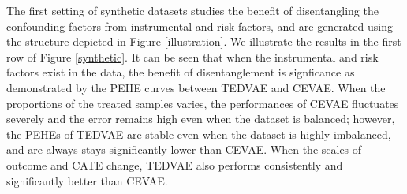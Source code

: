 \documentclass[letterpaper]{article} %
\begin{document}

The first setting of synthetic datasets studies the benefit of disentangling the confounding factors from instrumental and risk factors, and are generated using the structure depicted in Figure \ref{illustration}.
We illustrate the results in the first row of Figure \ref{synthetic}. It can be seen that when the instrumental and risk factors exist in the data, the benefit of disentanglement is signficance as demonstrated by the PEHE curves between TEDVAE and CEVAE. When the proportions of the treated samples varies, the performances of CEVAE fluctuates severely and the error remains high even when the dataset is balanced; however, the PEHEs of TEDVAE are stable even when the dataset is highly imbalanced, and are always stays significantly lower than CEVAE. When the scales of outcome and CATE change, TEDVAE also performs consistently and significantly better than CEVAE.
\end{document}
